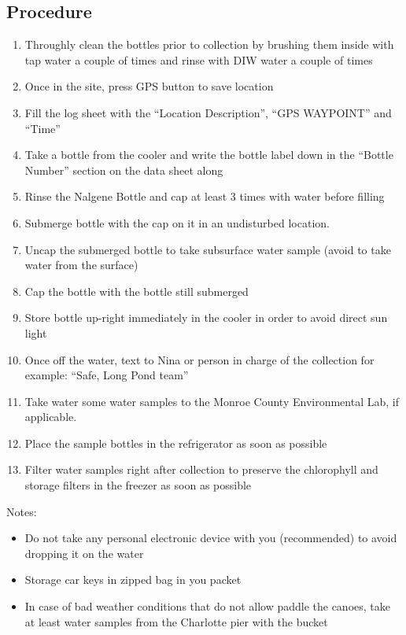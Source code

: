 \begin{appendices}
\subsection{Procedure}
\begin{enumerate}
  \item Throughly clean the bottles prior to collection by brushing them inside with tap water a couple of times and rinse with DIW water a couple of times
  \item Once in the site, press GPS button to save location
  \item Fill the log sheet with the ``Location Description'', ``GPS WAYPOINT'' and ``Time''
  \item Take a bottle from the cooler and write the bottle label down in the ``Bottle Number'' section on the data sheet along
  \item Rinse the Nalgene Bottle and cap at least 3 times with water before filling
  \item Submerge bottle with the cap on it in an undisturbed location.
  \item Uncap the submerged bottle  to take subsurface water sample (avoid to take water from the surface) \cite{Montana08} 
  \item Cap the bottle with the bottle still submerged
  \item Store bottle up-right immediately in the cooler in order to avoid direct sun light \cite{Mueller1995}
  \item Once off the water, text to Nina or person in charge of the collection for example: ``Safe, Long Pond team''
  \item Take water some water samples to the Monroe County Environmental Lab, if applicable.
  \item Place the sample bottles in the refrigerator as soon as possible
  \item Filter water samples right after collection to preserve the chlorophyll and storage filters in the freezer as soon as possible
\end{enumerate}
Notes: 
\begin{itemize}
  \item Do not take any personal electronic device with you (recommended) to avoid dropping it on the water
  \item Storage car keys in zipped bag in you packet
  \item In case of bad weather conditions that do not allow paddle the canoes, take at least water samples from the Charlotte pier with the bucket
\end{itemize}


\end{appendices}
